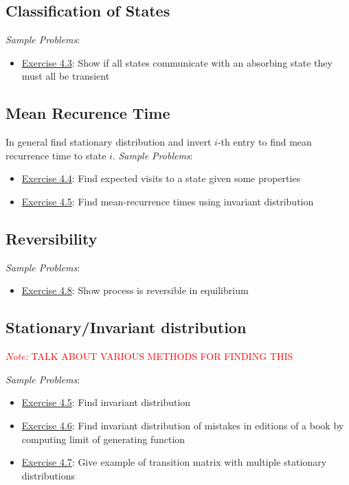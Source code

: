 \documentclass[12pt]{article}
\newcommand{\note}[1]{\textcolor{red}{\textit{Note:} #1}}
\begin{document}
\subsection{Classification of States}


\textit{Sample Problems}: 
\begin{itemize}[nolistsep]
    \item \hyperref[Exercise 4.3]{Exercise 4.3}: Show if all states communicate with an absorbing state they must all be transient
\end{itemize}

\subsection{Mean Recurence Time}
In general find stationary distribution and invert \( i \)-th entry to find mean recurrence time to state \( i \).
\textit{Sample Problems}: 
\begin{itemize}[nolistsep]
    \item \hyperref[Exercise 4.4]{Exercise 4.4}: Find expected visits to a state given some properties
    \item \hyperref[Exercise 4.5]{Exercise 4.5}: Find mean-recurrence times using invariant distribution
\end{itemize}

\subsection{Reversibility}
\textit{Sample Problems}: 
\begin{itemize}[nolistsep]
    \item \hyperref[Exercise 4.8]{Exercise 4.8}: Show process is reversible in equilibrium
\end{itemize}


\subsection{Stationary/Invariant distribution}

\note{TALK ABOUT VARIOUS METHODS FOR FINDING THIS}

\textit{Sample Problems}: 
\begin{itemize}[nolistsep]
    \item \hyperref[Exercise 4.5]{Exercise 4.5}: Find invariant distribution
    \item \hyperref[Exercise 4.6]{Exercise 4.6}: Find invariant distribution of mistakes in editions of a book by computing limit of generating function
    \item \hyperref[Exercise 4.7]{Exercise 4.7}: Give example of transition matrix with multiple stationary distributions
\end{itemize}
\end{document}
